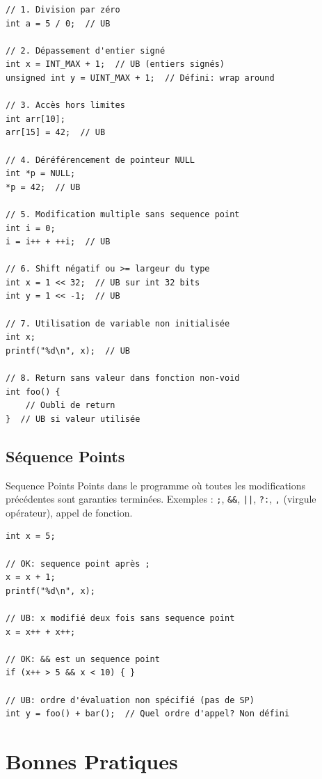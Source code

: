\documentclass[10pt,a4paper]{article}
\begin{document}
\begin{lstlisting}[caption={UB courants}]
// 1. Division par zéro
int a = 5 / 0;  // UB

// 2. Dépassement d'entier signé
int x = INT_MAX + 1;  // UB (entiers signés)
unsigned int y = UINT_MAX + 1;  // Défini: wrap around

// 3. Accès hors limites
int arr[10];
arr[15] = 42;  // UB

// 4. Déréférencement de pointeur NULL
int *p = NULL;
*p = 42;  // UB

// 5. Modification multiple sans sequence point
int i = 0;
i = i++ + ++i;  // UB

// 6. Shift négatif ou >= largeur du type
int x = 1 << 32;  // UB sur int 32 bits
int y = 1 << -1;  // UB

// 7. Utilisation de variable non initialisée
int x;
printf("%d\n", x);  // UB

// 8. Return sans valeur dans fonction non-void
int foo() {
    // Oubli de return
}  // UB si valeur utilisée
\end{lstlisting}

\subsection{Séquence Points}

\begin{definitionbox}{Sequence Points}
Points dans le programme où toutes les modifications précédentes sont garanties terminées. Exemples : \texttt{;}, \texttt{\&\&}, \texttt{||}, \texttt{?:}, \texttt{,} (virgule opérateur), appel de fonction.
\end{definitionbox}

\begin{lstlisting}[caption={Sequence points}]
int x = 5;

// OK: sequence point après ;
x = x + 1;
printf("%d\n", x);

// UB: x modifié deux fois sans sequence point
x = x++ + x++;

// OK: && est un sequence point
if (x++ > 5 && x < 10) { }

// UB: ordre d'évaluation non spécifié (pas de SP)
int y = foo() + bar();  // Quel ordre d'appel? Non défini
\end{lstlisting}

\section{Bonnes Pratiques}
\end{document}
